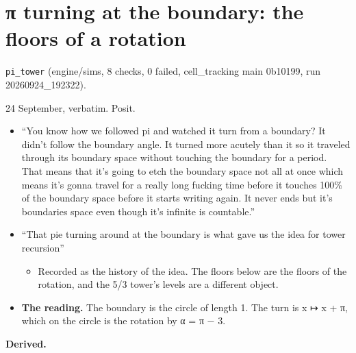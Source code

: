 \section{\texorpdfstring{π turning at the boundary: the floors of a rotation}{π turning at the boundary: the floors of a rotation}}

\texttt{pi\_\allowbreak{}tower} (engine/sims, 8 checks, 0 failed, cell\_\allowbreak{}tracking main 0b10199, run 20260924\_\allowbreak{}192322).

24 September, verbatim. Posit.

\begin{itemize}
\item “You know how we followed pi and watched it turn from a boundary? It didn't follow the boundary angle. It turned more acutely than it so it traveled through its boundary space without touching the boundary for a period. That means that it's going to etch the boundary space not all at once which means it's gonna travel for a really long fucking time before it touches 100\% of the boundary space before it starts writing again. It never ends but it's boundaries space even though it's infinite is countable.”
\item “That pie turning around at the boundary is what gave us the idea for tower recursion”

\begin{itemize}
\item Recorded as the history of the idea. The floors below are the floors of the rotation, and the 5/3 tower's levels are a different object.
\end{itemize}
\item \textbf{The reading.} The boundary is the circle of length 1. The turn is x ↦ x + π, which on the circle is the rotation by α = π − 3.
\end{itemize}

\textbf{Derived.}

